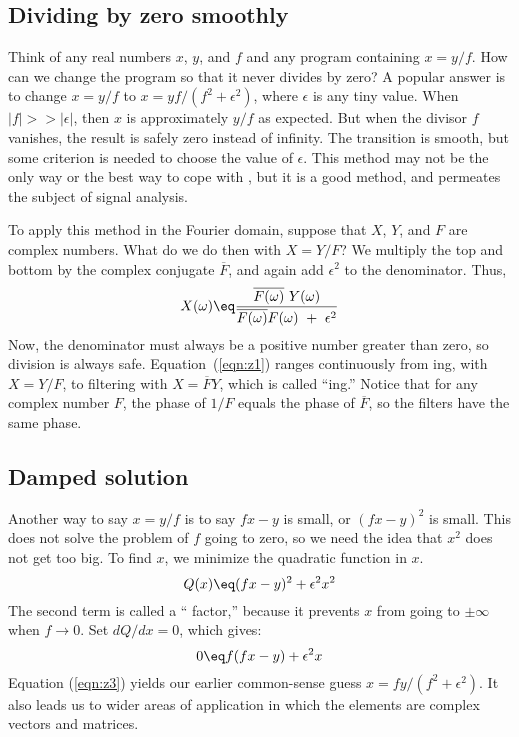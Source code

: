 \subsection{Dividing by zero smoothly}
Think of any real numbers $x$, $y$, and $f$ and any
program containing $x=y/f$.
How can we change the program so that it never divides by zero?
A popular answer is to change $x=y/f$
to $x=yf/(f^2+\epsilon^2)$, where $\epsilon$ is any tiny value.
When $|f| >> |\epsilon|$,
then $x$ is approximately $y/f$ as expected.
But when the divisor $f$ vanishes,
the result is safely zero instead of infinity.
The transition is smooth,
but some criterion is needed to choose the value of $\epsilon$.
This method may not be the only way or the best way
to cope with
,
but it is a good method,
and permeates the subject of signal analysis.
\par
To apply this method in the Fourier domain,
suppose that $X$, $Y$, and $F$ are complex numbers.
What do we do then with $X=Y/F$?
We multiply the
top and bottom by the complex conjugate $\overline{F}$,
and again add $\epsilon^2$ to the denominator.
Thus,
\begin{equation}
X(\omega) \eq
\frac{ \overline{F(\omega)} \ Y(\omega)  }{ \overline{F(\omega)} F(\omega) \ +\ \epsilon^2}
\label{eqn:z1}
\end{equation}
Now, 
the denominator must always be a positive number greater than zero,
so division is always safe.
Equation~(\ref{eqn:z1}) ranges continuously from
ing, with
$X=Y/F$, to filtering with $X=\overline{F}Y$,
which is called ``ing.''
Notice that for any complex number $F$,
the phase of $1/F$ equals the phase of $\overline{F}$,
so the filters 
have the same phase.
%
\subsection{Damped solution}
Another way to say $x=y/f$ is to say $fx-y$ is small, or $(fx-y)^2$ is small.
This does not solve the problem of $f$ going to zero,
so we need the idea that $x^2$ does not get too big.
To find $x$, we minimize the quadratic function in $x$.
\begin{equation}
Q(x) \eq (f x-y)^2 + \epsilon^2 x^2
\label{eqn:z2}
\end{equation}
The second term is called a `` factor,''
because it prevents $x$ from going to $\pm \infty$ when $f\rightarrow 0$.
Set $dQ/dx=0$, which gives:
\begin{equation}
0 \eq f(f x-y) + \epsilon^2 x
\label{eqn:z3}
\end{equation}
Equation (\ref{eqn:z3}) yields our earlier common-sense guess $x=fy/(f^2+\epsilon^2)$.
It also leads us to wider areas of application in which the elements are complex
vectors and matrices.

